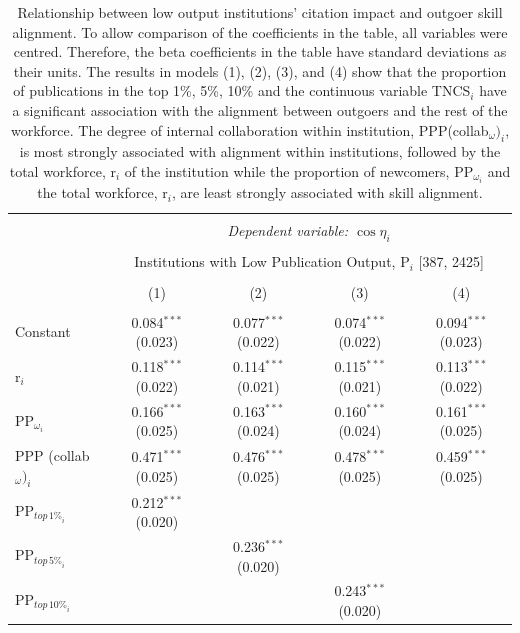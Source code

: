 \documentclass[draft,final]{vutinfth} %
\begin{document}
\begin{table}[!htbp] \centering 
  \caption{Relationship between low output institutions' citation impact and outgoer skill alignment. To allow comparison of the coefficients in the table, all variables were centred. Therefore, the beta coefficients in the table have standard deviations as their units. The results in models (1), (2), (3), and (4) show that the proportion of publications in the top 1\%, 5\%, 10\% and the continuous variable TNCS$_{i}$ have a significant association with the alignment between outgoers and the rest of the workforce. The degree of internal collaboration within institution, PPP(collab$_{\omega})_{i}$, is most strongly associated with alignment within institutions, followed by the total workforce, r$_{i}$ of the institution while the proportion of newcomers, PP$_{\omega_i}$ and the total workforce, r$_{i}$, are least strongly associated with skill alignment.} 
  \label{Table S5} 
  \label{} 
\small 
\scriptsize
\begin{tabularx}{\textwidth}{@{\extracolsep{\fill}}lcccc}
\\[-1.8ex]\hline 
\hline \\[-1.8ex] 
 & \multicolumn{4}{c}{\textit{Dependent variable: $\cos{\eta}_{i}$}} \\ 
\cline{2-5} \\[-1.8ex] & \multicolumn{4}{c}{Institutions with Low Publication Output, P$_{i}$ [387, 2425]} \\ 
\\[-1.8ex] & (1) & (2) & (3) & (4)\\ 
\hline \\[-1.8ex] 
 Constant & 0.084$^{***}$ (0.023) & 0.077$^{***}$ (0.022) & 0.074$^{***}$ (0.022) & 0.094$^{***}$ (0.023) \\ 
  r$_{i}$ & 0.118$^{***}$ (0.022) & 0.114$^{***}$ (0.021) & 0.115$^{***}$ (0.021) & 0.113$^{***}$ (0.022) \\ 
  PP$_{\omega_i}$ & 0.166$^{***}$ (0.025) & 0.163$^{***}$ (0.024) & 0.160$^{***}$ (0.024) & 0.161$^{***}$ (0.025) \\ 
  PPP (collab$_\omega)_{i}$ & 0.471$^{***}$ (0.025) & 0.476$^{***}$ (0.025) & 0.478$^{***}$ (0.025) & 0.459$^{***}$ (0.025) \\ 
  PP$_{{top\,1\%}_{i}}$ & 0.212$^{***}$ (0.020) &  &  &  \\ 
  PP$_{{top\,5\%}_{i}}$ &  & 0.236$^{***}$ (0.020) &  &  \\ 
  PP$_{{top\,10\%}_{i}}$ &  &  & 0.243$^{***}$ (0.020) &  \\ 

\end{tabularx}
\end{table}
\end{document}
